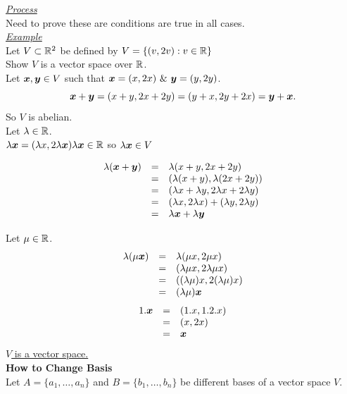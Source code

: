 \documentclass[11pt,a4paper]{article}
\begin{document}
\underline{\textit{Process}}\\
Need to prove these are conditions are true in all cases.\\

\underline{\textit{Example}}\\
Let $V \subset \mathbb{R}^2$ be defined by $V = \{(v, 2v) : v \in \mathbb{R} \}$\\
Show $V$ is a vector space over $\mathbb{R}$.\\

Let $\boldsymbol{x}, \boldsymbol{y} \in V$ such that $\boldsymbol{x} = (x, 2x)\ \&\ \boldsymbol{y} = (y, 2y)$.\\

\[\boldsymbol{x} + \boldsymbol{y} = (x + y, 2x + 2y) = (y + x, 2y + 2x) = \boldsymbol{y} + \boldsymbol{x}.\]
So $V$ is abelian.\\

Let $\lambda \in \mathbb{R}$.\\
$\lambda\boldsymbol{x} = (\lambda x, 2\lambda \boldsymbol{x})\\ \lambda \boldsymbol{x} \in \mathbb{R}$ so $\lambda \boldsymbol{x} \in V$

\[\begin{array}{rcl}
  \lambda(\boldsymbol{x} + \boldsymbol{y}) &=& \lambda(x + y, 2x + 2y)\\
  &=& (\lambda(x + y), \lambda(2x + 2y))\\
  &=& (\lambda x + \lambda y, 2\lambda x + 2\lambda y)\\
  &=& (\lambda x, 2\lambda x) + (\lambda y, 2 \lambda y)\\
  &=& \lambda\boldsymbol{x} + \lambda\boldsymbol{y}
\end{array}\]

\newpage Let $\mu \in \mathbb{R}$.\\
\[\begin{array}{rcl}
  \lambda(\mu\boldsymbol{x}) &=& \lambda(\mu x, 2\mu x)\\
  &=& (\lambda\mu x, 2\lambda\mu x)\\
  &=& ((\lambda\mu)x, 2(\lambda\mu)x)\\
  &=& (\lambda\mu)\boldsymbol{x}
\end{array}\]
\[\begin{array}{rcl}
  1.\boldsymbol{x} &=& (1.x, 1.2.x)\\
  &=& (x, 2x)\\
  &=& \boldsymbol{x}
\end{array}\]
\underline{$V$ is a vector space.}\\

\textbf{How to Change Basis}\\
Let $A = \{ a_1, \dots, a_n\}$ and $B = \{ b_1, \dots, b_n \}$ be different bases of a vector space $V$.\\
\end{document}
